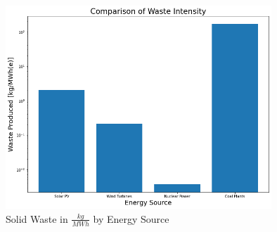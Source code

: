 \begin{figure}[h!]
\centering
\includegraphics[width = 10cm]{img/mass-waste-intensity.png}
\caption{Solid Waste in $\frac{kg}{MWh}$ by Energy Source}
\label{fig:mass-waste}
\end{figure}